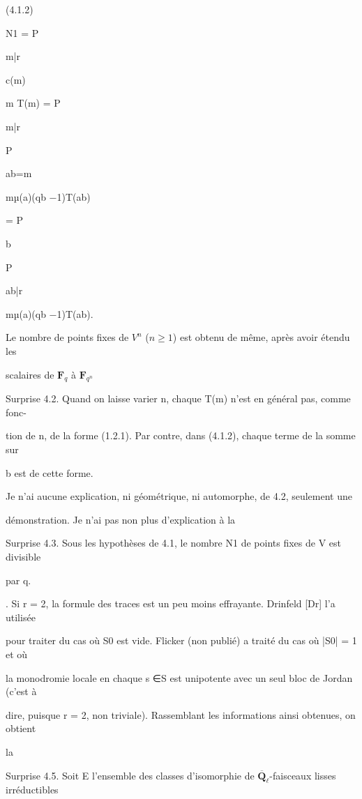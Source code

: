\documentclass[11pt]{article}
\begin{document}
\noindent (4.1.2)\par
\noindent N1 = P\par
\noindent m|r\par
\noindent c(m)\par
\noindent m T(m) = P\par
\noindent m|r\par
\noindent P\par
\noindent ab=m\par
\noindent mµ(a)(qb −1)T(ab)\par
\noindent = P\par
\noindent b\par
\noindent P\par
\noindent ab|r\par
\noindent mµ(a)(qb −1)T(ab).\par
\noindent Le nombre de points fixes de \(V^n\) (\(n\geq 1\)) est obtenu de même, après avoir étendu les\par
\noindent scalaires de \(\mathbf F_q\) à \(\mathbf F_{q^n}\)\par
\noindent Surprise 4.2. Quand on laisse varier n, chaque T(m) n’est en général pas, comme fonc-\par
\noindent tion de n, de la forme (1.2.1). Par contre, dans (4.1.2), chaque terme de la somme sur\par
\noindent b est de cette forme.\par
\noindent Je n’ai aucune explication, ni géométrique, ni automorphe, de 4.2, seulement une\par
\noindent démonstration. Je n’ai pas non plus d’explication à la\par
\noindent Surprise 4.3. Sous les hypothèses de 4.1, le nombre N1 de points fixes de V est divisible\par
\noindent par q.\par
{}. Si r = 2, la formule des traces est un peu moins effrayante. Drinfeld [Dr] l’a utilisée\par
\noindent pour traiter du cas où S0 est vide. Flicker (non publié) a traité du cas où |S0| = 1 et où\par
\medskip
\noindent la monodromie locale en chaque s ∈S est unipotente avec un seul bloc de Jordan (c’est à\par
\noindent dire, puisque r = 2, non triviale). Rassemblant les informations ainsi obtenues, on obtient\par
\noindent la\par
\noindent Surprise 4.5. Soit E l’ensemble des classes d’isomorphie de \(\overline{\mathbf Q}_{\ell}\)-faisceaux lisses irréductibles\par
\end{document}
